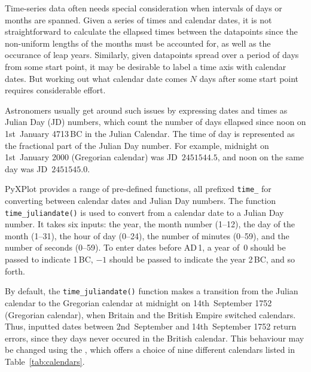 Time-series data often needs special consideration when intervals of days or
months are spanned. Given a series of times and calendar dates, it is not
straightforward to calculate the ellapsed times between the datapoints since
the non-uniform lengths of the months must be accounted for, as well as the
occurance of leap years. Similarly, given datapoints spread over a period of
days from some start point, it may be desirable to label a time axis with
calendar dates. But working out what calendar date comes $N$ days after some
start point requires considerable effort.

Astronomers usually get around such issues by expressing dates and times as
Julian Day (JD) numbers, which count the number of
days ellapsed since noon on 1st~January 4713\,{\footnotesize BC} in the Julian
Calendar. The time of day is represented as the fractional part of the Julian
Day number. For example, midnight on 1st~January 2000 (Gregorian calendar) was
JD~$2451544.5$, and noon on the same day was JD~$2451545.0$.

PyXPlot provides a range of pre-defined functions, all prefixed {\tt time\_}
for converting between calendar dates and Julian Day numbers. The function {\tt
time\_juliandate()} is used to convert from a calendar
date to a Julian Day number. It takes six inputs: the year, the month number
(1--12), the day of the month (1--31), the hour of day (0--24), the number of
minutes (0--59), and the number of seconds (0--59). To enter dates before
{\footnotesize AD}\,1, a year of~$0$ should be passed to indicate
1\,{\footnotesize BC}, $-1$ should be passed to indicate the year
2\,{\footnotesize BC}, and so forth.

\vspace{3mm}
\newline
{}
\vspace{3mm}

By default, the {\tt time\_juliandate()} function makes a transition from the
Julian calendar to the Gregorian calendar at midnight on 14th~September 1752
(Gregorian calendar), when Britain and the British Empire switched calendars.
Thus, inputted dates between 2nd~September and 14th~September 1752 return
errors, since they days never occured in the British calendar. This behaviour
may be changed using the , which offers a choice of nine
different calendars listed in Table~\ref{tab:calendars}.

